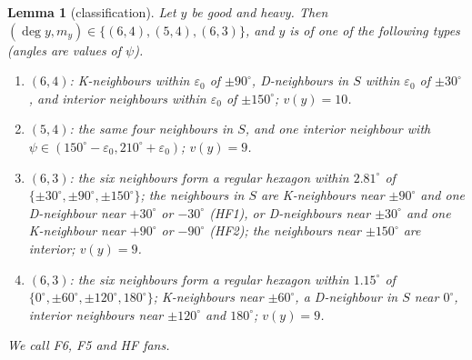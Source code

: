 \documentclass[11pt]{amsart}
\newtheorem{lemma}[theorem]{Lemma}
\theoremstyle{definition}
\theoremstyle{remark}
\newcommand{\eps}{\varepsilon}
\begin{document}
\begin{lemma}[classification]\label{lem:heavy}
Let $y$ be good and heavy. Then $(\deg y,m_y)\in\{(6,4),(5,4),(6,3)\}$, and $y$ is of one of the following types (angles are values of $\psi$).
\begin{enumerate}[leftmargin=3.2em]
\item[\textup{(F6)}] $(6,4)$: K-neighbours within $\eps_0$ of $\pm90^\circ$, D-neighbours in $S$ within $\eps_0$ of $\pm30^\circ$, and interior neighbours within $\eps_0$ of $\pm150^\circ$; $v(y)=10$.
\item[\textup{(F5)}] $(5,4)$: the same four neighbours in $S$, and one interior neighbour with $\psi\in(150^\circ-\eps_0,210^\circ+\eps_0)$; $v(y)=9$.
\item[\textup{(HF)}] $(6,3)$: the six neighbours form a regular hexagon within $2.81^\circ$ of $\{\pm30^\circ,\pm90^\circ,\pm150^\circ\}$; the neighbours in $S$ are K-neighbours near $\pm90^\circ$ and one D-neighbour near $+30^\circ$ or $-30^\circ$ (HF1), or D-neighbours near $\pm30^\circ$ and one K-neighbour near $+90^\circ$ or $-90^\circ$ (HF2); the neighbours near $\pm150^\circ$ are interior; $v(y)=9$.
\item[\textup{(cap)}] $(6,3)$: the six neighbours form a regular hexagon within $1.15^\circ$ of $\{0^\circ,\pm60^\circ,\pm120^\circ,180^\circ\}$; K-neighbours near $\pm60^\circ$, a D-neighbour in $S$ near $0^\circ$, interior neighbours near $\pm120^\circ$ and $180^\circ$; $v(y)=9$.
\end{enumerate}
We call F6, F5 and HF \emph{fans}.
\end{lemma}
\end{document}
